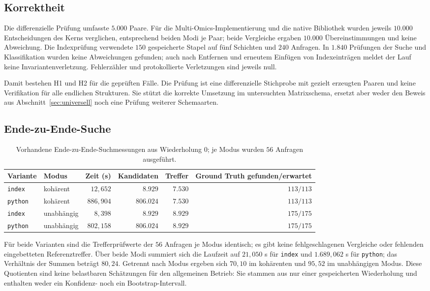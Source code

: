 \documentclass[a4paper,12pt, twoside]{report}
\theoremstyle{definition}
\begin{document}
\subsection{Korrektheit}

Die differenzielle Prüfung umfasste $5.000$ Paare. Für die Multi-Omics-Implementierung und die native Bibliothek wurden jeweils $10.000$ Entscheidungen des Kerns verglichen, entsprechend beiden Modi je Paar; beide Vergleiche ergaben $10.000$ Übereinstimmungen und keine Abweichung. Die Indexprüfung verwendete $150$ gespeicherte Stapel auf fünf Schichten und $240$ Anfragen. In $1.840$ Prüfungen der Suche und Klassifikation wurden keine Abweichungen gefunden; auch nach Entfernen und erneutem Einfügen von Indexeinträgen meldet der Lauf keine Invariantenverletzung. Fehlerzähler und protokollierte Verletzungen sind jeweils null.

Damit bestehen H1 und H2 für die geprüften Fälle. Die Prüfung ist eine differenzielle Stichprobe mit gezielt erzeugten Paaren und keine Verifikation für alle endlichen Strukturen. Sie stützt die korrekte Umsetzung im untersuchten Matrixschema, ersetzt aber weder den Beweis aus Abschnitt~\ref{sec:universell} noch eine Prüfung weiterer Schemaarten.

\subsection{Ende-zu-Ende-Suche}

\begin{table}[!ht]
	\centering
	\small
	\caption{Vorhandene Ende-zu-Ende-Suchmessungen aus Wiederholung $0$; je Modus wurden $56$ Anfragen ausgeführt.}
	\label{tab:ucx_search_results}
	\begin{tabular}{llrrrr}
		\toprule
		Variante & Modus & Zeit (s) & Kandidaten & Treffer & Ground Truth gefunden/erwartet \\
		\midrule
		\texttt{index} & kohärent & $12{,}652$ & $8.929$ & $7.530$ & $113/113$ \\
		\texttt{python} & kohärent & $886{,}904$ & $806.024$ & $7.530$ & $113/113$ \\
		\texttt{index} & unabhängig & $8{,}398$ & $8.929$ & $8.929$ & $175/175$ \\
		\texttt{python} & unabhängig & $802{,}158$ & $806.024$ & $8.929$ & $175/175$ \\
		\bottomrule
	\end{tabular}
\end{table}

Für beide Varianten sind die Trefferprüfwerte der $56$ Anfragen je Modus identisch; es gibt keine fehlgeschlagenen Vergleiche oder fehlenden eingebetteten Referenztreffer. Über beide Modi summiert sich die Laufzeit auf $21{,}050$ s für \texttt{index} und $1.689{,}062$ s für \texttt{python}; das Verhältnis der Summen beträgt $80{,}24$. Getrennt nach Modus ergeben sich $70{,}10$ im kohärenten und $95{,}52$ im unabhängigen Modus. Diese Quotienten sind keine belastbaren Schätzungen für den allgemeinen Betrieb: Sie stammen aus nur einer gespeicherten Wiederholung und enthalten weder ein Konfidenz- noch ein Bootstrap-Intervall.
\end{document}
